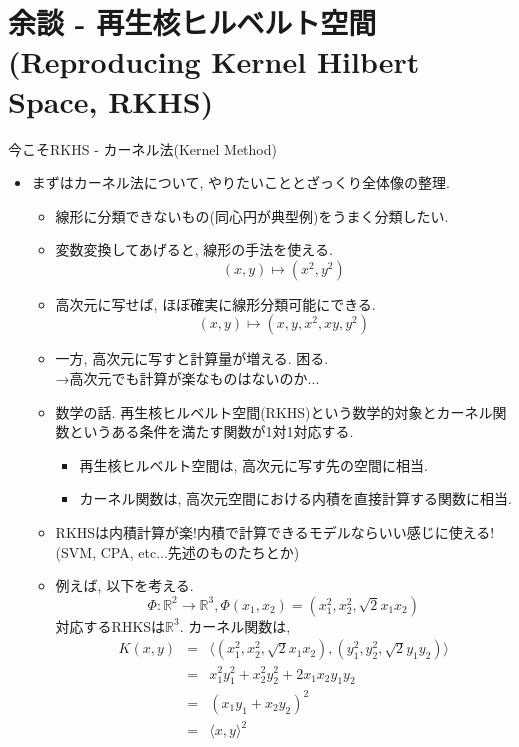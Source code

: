 \documentclass[dvipdfmx,8pt]{beamer}
\begin{document}
  \section{余談 - 再生核ヒルベルト空間\\(Reproducing Kernel Hilbert Space, RKHS)}
  \begin{frame}{今こそRKHS - カーネル法(Kernel Method)}
    \begin{itemize}
      \item まずはカーネル法について, やりたいこととざっくり全体像の整理. \\
        \begin{itemize}
          \item 線形に分類できないもの(同心円が典型例)をうまく分類したい.
          \item 変数変換してあげると, 線形の手法を使える. \\
            \[
              (x,y) \mapsto (x^2,y^2)
            \]
          \item 高次元に写せば, ほぼ確実に線形分類可能にできる.
            \[
              (x,y)\mapsto (x,y,x^2,xy,y^2)
            \]
          \item 一方, 高次元に写すと計算量が増える. 困る. \\
            →高次元でも計算が楽なものはないのか...
          \item 数学の話. 再生核ヒルベルト空間(RKHS)という数学的対象とカーネル関数というある条件を満たす関数が1対1対応する.
            \begin{itemize}
              \item 再生核ヒルベルト空間は, 高次元に写す先の空間に相当.
              \item カーネル関数は, 高次元空間における内積を直接計算する関数に相当.
            \end{itemize}
          \item RKHSは内積計算が楽!内積で計算できるモデルならいい感じに使える!\\
            (SVM, CPA, etc...先述のものたちとか)
          \item 例えば, 以下を考える.
            \[
              \Phi\colon \mathbb{R}^2\to\mathbb{R}^3, \Phi(x_1,x_2)=(x_1^2,x_2^2,\sqrt{2}x_1x_2)
            \]
            対応するRHKSは$\mathbb{R}^3$.
            カーネル関数は,
            \begin{eqnarray*}
              K(x,y)&=&\langle(x_1^2,x_2^2,\sqrt{2}x_1x_2),(y_1^2,y_2^2,\sqrt{2}y_1y_2)\rangle\\
              &=&x_1^2y_1^2+x_2^2y_2^2+2x_1x_2y_1y_2\\
              &=&(x_1y_1+x_2y_2)^2\\
              &=&\langle x,y\rangle^2
            \end{eqnarray*}
        \end{itemize}
    \end{itemize}
  \end{frame}
\end{document}
